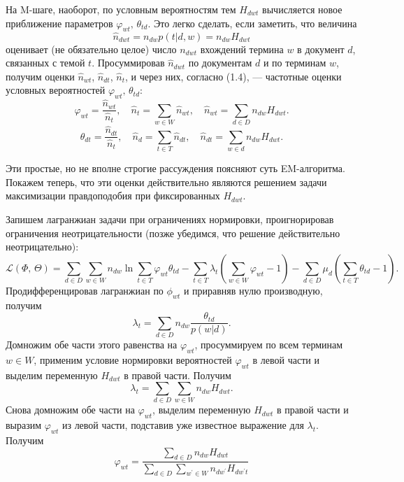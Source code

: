 \documentclass[article, 10pt]{disser}
\begin{document}
На M-шаге, наоборот, по условным вероятностям тем $H_{dwt}$ вычисляется новое приближение параметров $\varphi_{wt},\, \theta_{td}$. Это легко сделать, если заметить, что величина 
\begin{equation*}
    \hat{n}_{dwt} = n_{dw}p(t| d, w) = n_{dw}H_{dwt}
\end{equation*}
оценивает (не обязательно целое) число $n_{dwt}$ вхождений термина $w$ в документ $d$, связанных с темой $t$. Просуммировав $\hat{n}_{dwt}$ по документам $d$ и по терминам $w$, получим оценки $\hat{n}_{wt}$, $\hat{n}_{dt}$, $\hat{n}_{t}$, и через них, согласно (1.4), --- частотные оценки условных вероятностей $\varphi_{wt},\, \theta_{td}$:
\begin{equation*}
    \varphi_{wt} = \frac{\hat{n}_{wt}}{\hat{n}_{t}},\quad \hat{n}_t =\sum\limits_{w \in W}\hat{n}_{wt},\quad \hat{n}_{wt} = \sum\limits_{d \in D}n_{dw}H_{dwt}.
\end{equation*}
\begin{equation*}
     \theta_{dt} = \frac{\hat{n}_{dt}}{\hat{n}_{t}},\quad \hat{n}_d =\sum\limits_{t \in T}\hat{n}_{dt},\quad \hat{n}_{dt} = \sum\limits_{w \in d}n_{dw}H_{dwt}.
\end{equation*}

Эти простые, но не вполне строгие рассуждения поясняют суть EM-алгоритма. Покажем теперь, что эти оценки действительно являются решением задачи максимизации правдоподобия при фиксированных $H_{dwt}$.

Запишем лагранжиан задачи при ограничениях нормировки, проигнорировав ограничения неотрицательности (позже убедимся, что решение действительно
неотрицательно):
\begin{equation*}
    \mathcal{L}(\Phi,\,\Theta) = \sum\limits_{d \in D}\sum\limits_{w \in W}n_{dw}\ln \sum\limits_{t \in T}\varphi_{wt}\theta_{td} - \sum\limits_{t \in T}\lambda_{t}\left(\sum\limits_{w \in W}\varphi_{wt}-1\right) - \sum\limits_{d \in D}\mu_d\left(\sum\limits_{t \in T}\theta_{td}-1\right).
\end{equation*}
Продифференцировав лагранжиан по $\phi_{wt}$ и приравняв нулю производную, получим
\begin{equation*}
    \lambda_t = \sum\limits_{d \in D}n_{dw}\frac{\theta_{td}}{p(w|d)}.
\end{equation*}
Домножим обе части этого равенства на $\varphi_{wt}$, просуммируем по всем терминам $w \in W$, применим условие нормировки вероятностей $\varphi_{wt}$ в левой части и выделим переменную $H_{dwt}$ в правой части. Получим
\begin{equation*}
    \lambda_t = \sum\limits_{d \in D}\sum\limits_{w \in W}n_{dw}H_{dwt}.
\end{equation*}
Снова домножим обе части на $\varphi_{wt}$, выделим переменную $H_{dwt}$ в правой части и выразим $\varphi_{wt}$ из левой части, подставив уже известное выражение для $\lambda_t$. Получим
\begin{equation*}
    \varphi_{wt} = \frac{\sum\limits_{d \in D}n_{dw}H_{dwt}}{\sum\limits_{d \in D}\sum\limits_{w^{'} \in W}n_{dw^{'}}H_{dw^{'}t}}
\end{equation*}
\end{document}
